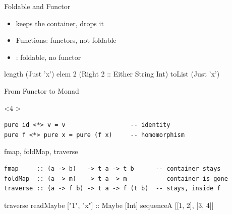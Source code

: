 \begin{frame}{Foldable and Functor}
\begin{itemize}
   \item<1->  keeps the container,  drops it
   \item<2-> Functions: functors, not foldable
   \item<2-> : foldable, no functor
\end{itemize}
\vspace{2mm}
\begin{ghcisession}[start=3]
length (Just 'x')
elem 2 (Right 2 :: Either String Int)
toList (Just 'x')
\end{ghcisession}
\end{frame}

\begin{frame}[fragile]{From Functor to Monad}
\begin{fullwidth}\centering
{}\end{fullwidth}
\vspace{1mm}
\begin{uncoverenv}<4->
\begin{verbatim}
pure id <*> v = v                  -- identity
pure f <*> pure x = pure (f x)     -- homomorphism
\end{verbatim}
\end{uncoverenv}
\end{frame}

\begin{frame}[fragile]{fmap, foldMap, traverse}
%
\begin{verbatim}
fmap     :: (a -> b)   -> t a -> t b      -- container stays
foldMap  :: (a -> m)   -> t a -> m        -- container is gone
traverse :: (a -> f b) -> t a -> f (t b)  -- stays, inside f
\end{verbatim}
\vspace{3mm}
\begin{ghcisession}[start=2]
traverse readMaybe ["1", "x"] :: Maybe [Int]
sequenceA [[1, 2], [3, 4]]
\end{ghcisession}
\end{frame}

